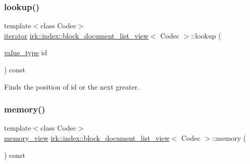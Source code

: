 \mbox{\label{classirk_1_1index_1_1block__document__list__view_a5b34a202589c619eb9e2aec9043dfd02}} 
\subsubsection{\texorpdfstring{lookup()}{lookup()}}
{\footnotesize\ttfamily template$<$class Codec$>$ \\
\mbox{\hyperlink{classirk_1_1index_1_1block__document__list__view_afc4738502c6c0b43f8487be16136feec}{iterator}} \mbox{\hyperlink{classirk_1_1index_1_1block__document__list__view}{irk\+::index\+::block\+\_\+document\+\_\+list\+\_\+view}}$<$ Codec $>$\+::lookup (\begin{DoxyParamCaption}\item[{\mbox{\hyperlink{classirk_1_1index_1_1block__document__list__view_a06e2f36c5850de123fefa071ae56da92}{value\+\_\+type}}}]{id }\end{DoxyParamCaption}) const\hspace{0.3cm}{\ttfamily [inline]}}



Finds the position of {\ttfamily id} or the next greater. 

\mbox{\label{classirk_1_1index_1_1block__document__list__view_a05d9aaf476ec8dc2a5077e5d549b8915}} 
\subsubsection{\texorpdfstring{memory()}{memory()}}
{\footnotesize\ttfamily template$<$class Codec$>$ \\
\mbox{\hyperlink{classirk_1_1memory__view}{memory\+\_\+view}} \mbox{\hyperlink{classirk_1_1index_1_1block__document__list__view}{irk\+::index\+::block\+\_\+document\+\_\+list\+\_\+view}}$<$ Codec $>$\+::memory (\begin{DoxyParamCaption}{ }\end{DoxyParamCaption}) const\hspace{0.3cm}{\ttfamily [inline]}}

